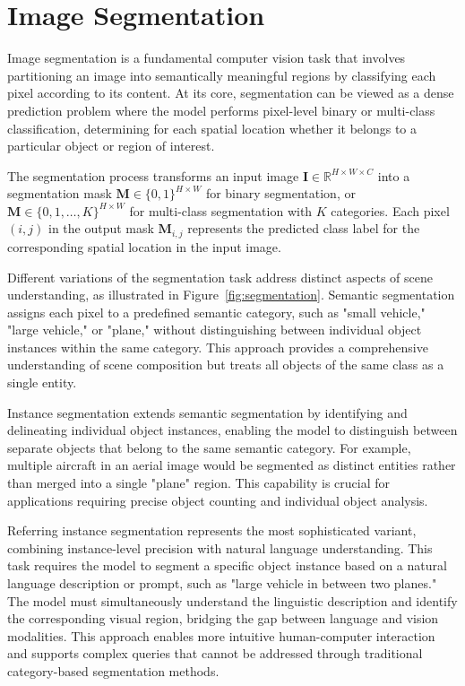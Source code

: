 \FloatBarrier

\section{Image Segmentation}

Image segmentation is a fundamental computer vision task that involves partitioning an image into semantically meaningful regions by classifying each pixel according to its content. At its core, segmentation can be viewed as a dense prediction problem where the model performs pixel-level binary or multi-class classification, determining for each spatial location whether it belongs to a particular object or region of interest.

The segmentation process transforms an input image $\mathbf{I} \in \mathbb{R}^{H \times W \times C}$ into a segmentation mask $\mathbf{M} \in \{0, 1\}^{H \times W}$ for binary segmentation, or $\mathbf{M} \in \{0, 1, \ldots, K\}^{H \times W}$ for multi-class segmentation with $K$ categories. Each pixel $(i, j)$ in the output mask $\mathbf{M}_{i,j}$ represents the predicted class label for the corresponding spatial location in the input image.

Different variations of the segmentation task address distinct aspects of scene understanding, as illustrated in Figure~\ref{fig:segmentation}. Semantic segmentation assigns each pixel to a predefined semantic category, such as "small vehicle," "large vehicle," or "plane," without distinguishing between individual object instances within the same category. This approach provides a comprehensive understanding of scene composition but treats all objects of the same class as a single entity.

Instance segmentation extends semantic segmentation by identifying and delineating individual object instances, enabling the model to distinguish between separate objects that belong to the same semantic category. For example, multiple aircraft in an aerial image would be segmented as distinct entities rather than merged into a single "plane" region. This capability is crucial for applications requiring precise object counting and individual object analysis.

Referring instance segmentation represents the most sophisticated variant, combining instance-level precision with natural language understanding. This task requires the model to segment a specific object instance based on a natural language description or prompt, such as "large vehicle in between two planes." The model must simultaneously understand the linguistic description and identify the corresponding visual region, bridging the gap between language and vision modalities. This approach enables more intuitive human-computer interaction and supports complex queries that cannot be addressed through traditional category-based segmentation methods.

